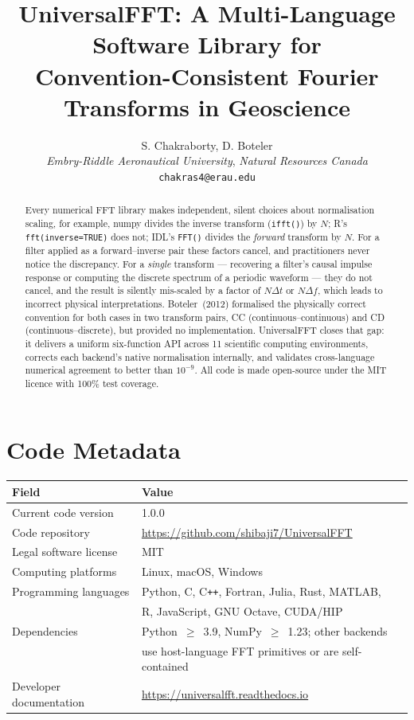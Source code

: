 \documentclass[12pt,a4paper]{article}
\title{\textbf{UniversalFFT: A Multi-Language Software Library for\\
Convention-Consistent Fourier Transforms in Geoscience}}
\author{S. Chakraborty, D. Boteler\\
\small\textit{Embry-Riddle Aeronautical University}, \textit{Natural Resources Canada}\\
\small\texttt{chakras4@erau.edu}}
\date{}
\begin{document}
\linenumbers
\maketitle

\section*{Code Metadata}
\begin{table}[h!]
\centering
\begin{tabular}{@{}ll@{}}
\toprule
\textbf{Field} & \textbf{Value} \\
\midrule
Current code version & 1.0.0 \\
Code repository & \url{https://github.com/shibaji7/UniversalFFT} \\
Legal software license & MIT \\
Computing platforms & Linux, macOS, Windows \\
Programming languages & Python, C, C\texttt{++}, Fortran, Julia, Rust, MATLAB, \\
                       & R, JavaScript, GNU Octave, CUDA/HIP \\
Dependencies & Python~$\geq$~3.9, NumPy~$\geq$~1.23; other backends \\
             & use host-language FFT primitives or are self-contained \\
Developer documentation & \url{https://universalfft.readthedocs.io} \\
\bottomrule
\end{tabular}
\end{table}

\begin{abstract}
Every numerical FFT library makes independent, silent choices about normalisation
scaling, for example, numpy divides the inverse transform (\texttt{ifft()}) by $N$; 
R's \texttt{fft(inverse=TRUE)} does not; IDL's \texttt{FFT()} divides the \emph{forward} 
transform by $N$. For a filter applied as a forward--inverse pair these factors cancel, and
practitioners never notice the discrepancy. For a \emph{single} transform ---
recovering a filter's causal impulse response or computing the discrete spectrum
of a periodic waveform --- they do not cancel, and the result is silently
mis-scaled by a factor of $N\Delta t$ or $N\Delta f$, which leads to incorrect physical interpretations.
Boteler~(2012) formalised the physically correct convention for both cases in two
transform pairs, CC (continuous--continuous) and CD (continuous--discrete), but
provided no implementation. UniversalFFT closes that gap: it delivers a uniform
six-function API across 11 scientific computing environments, corrects each
backend's native normalisation internally, and validates cross-language numerical
agreement to better than $10^{-9}$.
All code is made open-source under the MIT licence with 100\% test coverage.
\end{abstract}
\end{document}
